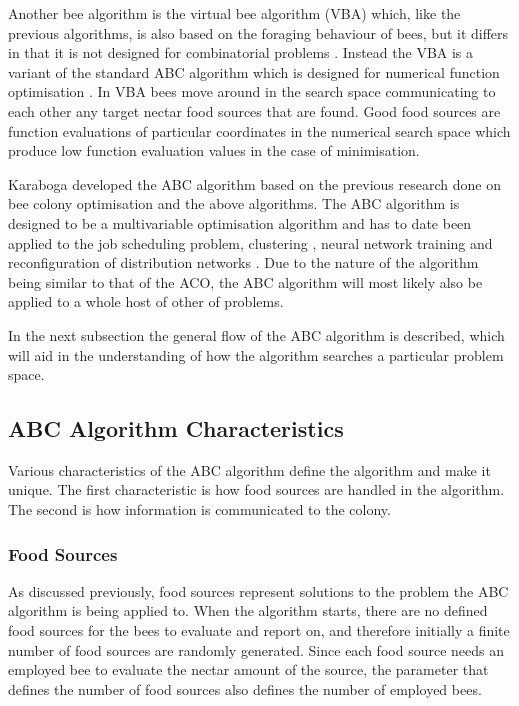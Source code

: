 Another bee algorithm is the virtual bee algorithm (VBA) which, like the previous algorithms, is also based on the foraging behaviour of bees, but it differs in that it is not designed for combinatorial problems \cite{ABCNumericalOptimization}. Instead the VBA is a variant of the standard ABC algorithm which is designed for numerical function optimisation \cite{ABCNumericalOptimization}. In VBA bees move around in the search space communicating to each other any target nectar food sources that are found\cite{ABCNumericalOptimization}. Good food sources are function evaluations of particular coordinates in the numerical search space which produce low function evaluation values in the case of minimisation\cite{ABCNumericalOptimization}.

Karaboga developed the ABC algorithm based on the previous research done on bee colony optimisation and the above algorithms. The ABC algorithm is designed to be a multivariable optimisation algorithm and has to date been applied to the job scheduling problem, clustering \cite{HybridABCClustering}, neural network training and reconfiguration of distribution networks \cite{ABCReconfigDistro}. Due to the nature of the algorithm being similar to that of the ACO, the ABC algorithm will most likely also be applied to a whole host of other of problems.

In the next subsection the general flow of the ABC algorithm is described, which will aid in the understanding of how the algorithm searches a particular problem space. 
\subsection{ABC Algorithm Characteristics}
Various characteristics of the ABC algorithm define the algorithm and make it unique. The first characteristic is how food sources are handled in the algorithm. The second is how information is communicated to the colony.
\subsubsection{Food Sources}
\label{sec:foodsources}
As discussed previously, food sources represent solutions to the problem the ABC algorithm is being applied to. When the algorithm starts, there are no defined food sources for the bees to evaluate and report on, and therefore initially a finite number of food sources are randomly generated\cite{BeeJobShop,ABCCompareStudy,ABCFusionGrid,ABCNumericalOptimization,ABCImageEnhancement,ABCReconfigDistro}. Since each food source needs an employed bee to evaluate the nectar amount of the source, the parameter that defines the number of food sources also defines the number of employed bees\cite{ABCCompareStudy,ABCLeafConstrained,ABCNumericalOptimization,ABCImageEnhancement}.

